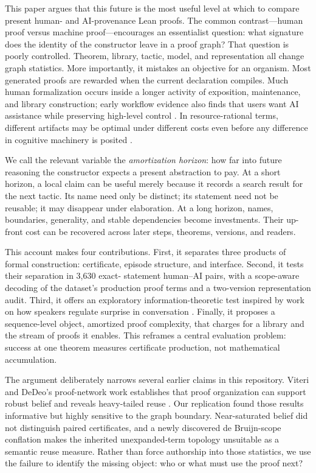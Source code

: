 \documentclass[10pt]{article}
\begin{document}
This paper argues that this future is the most useful level at which to compare present human- and
AI-provenance Lean proofs.  The common contrast---human proof versus machine proof---encourages an
essentialist question: what signature does the identity of the constructor leave in a proof graph?
That question is poorly controlled.  Theorem, library, tactic, model, and representation all change
graph statistics.  More importantly, it mistakes an objective for an organism.  Most generated
proofs are rewarded when the current declaration compiles.  Much human formalization occurs inside
a longer activity of exposition, maintenance, and library construction; early workflow evidence
also finds that users want AI assistance while preserving high-level control \citep{collins2026}.
In resource-rational terms, different artifacts may be optimal under different costs even before
any difference in cognitive machinery is posited \citep{lieder2020}.

We call the relevant variable the \emph{amortization horizon}: how far into future reasoning the
constructor expects a present abstraction to pay.  At a short horizon, a local claim can be useful
merely because it records a search result for the next tactic.  Its name need only be distinct; its
statement need not be reusable; it may disappear under elaboration.  At a long horizon, names,
boundaries, generality, and stable dependencies become investments.  Their up-front cost can be
recovered across later steps, theorems, versions, and readers.

This account makes four contributions.  First, it separates three products of formal construction:
certificate, episode structure, and interface.  Second, it tests their separation in 3,630 exact-
statement human--AI pairs, with a scope-aware decoding of the dataset's production proof terms and
a two-version representation audit.  Third, it offers
an exploratory information-theoretic test inspired by work on how speakers regulate surprise in
conversation \citep{bergey2024}.  Finally, it proposes a sequence-level object, amortized proof
complexity, that charges for a library and the stream of proofs it enables.  This reframes a central
evaluation problem: success at one theorem measures certificate production, not mathematical
accumulation.

The argument deliberately narrows several earlier claims in this repository.  Viteri and DeDeo's
proof-network work establishes that proof organization can support robust belief and reveals
heavy-tailed reuse \citep{viteri2022}.  Our replication found those results informative but highly
sensitive to the graph boundary.  Near-saturated belief did not distinguish paired certificates,
and a newly discovered de Bruijn-scope conflation makes the inherited unexpanded-term topology
unsuitable as a semantic reuse measure.  Rather than force authorship into those statistics, we use
the failure to identify the missing object: who or what must use the proof next?
\end{document}
